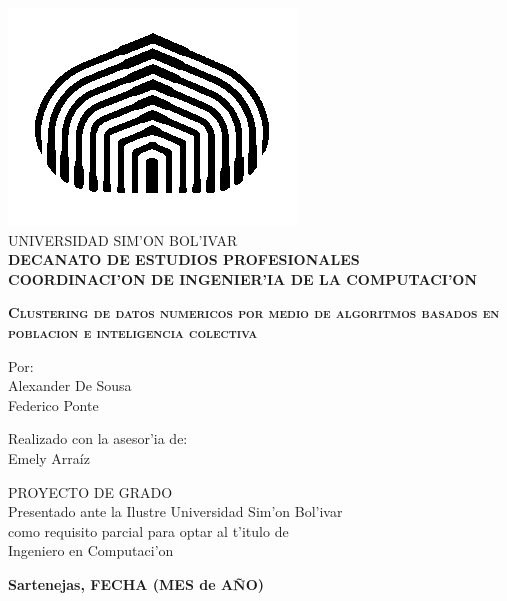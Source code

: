 \begin{titlepage}
\begin{center}

\includegraphics[scale=0.5,type=png,ext=.png,read=.png]{figures/cebolla} \\

\textsc {\large UNIVERSIDAD SIM'ON BOL'IVAR} \\
\textsc{\bfseries DECANATO DE ESTUDIOS PROFESIONALES\\
COORDINACI'ON DE INGENIER'IA DE LA COMPUTACI'ON}

\bigskip
\bigskip
\bigskip
\bigskip
\bigskip
\bigskip
\bigskip
\bigskip
\bigskip

\textsc{\bfseries Clustering de datos numericos por medio de algoritmos basados en poblacion e inteligencia colectiva}

\bigskip
\bigskip
\bigskip
\bigskip
\bigskip

\begin{minipage}{\textwidth}
\centering
Por: \\
Alexander De Sousa\\
Federico Ponte \\

\bigskip
\bigskip
\bigskip

Realizado con la asesor'ia de: \\
Emely Arra\'iz
\end{minipage}

\bigskip
\bigskip
\bigskip
\bigskip
\bigskip
\bigskip
\bigskip
\bigskip
\bigskip

{PROYECTO DE GRADO \\ Presentado ante la Ilustre Universidad Sim'on Bol'ivar \\
como requisito parcial para optar al t'itulo de \\ Ingeniero en Computaci'on} \\

\bigskip
\bigskip
\vfill

{\large \bfseries Sartenejas, FECHA (MES de A\~NO)}

\end{center}
\end{titlepage}
